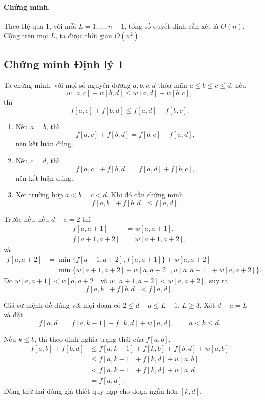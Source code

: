 \documentclass[11pt]{article}
\begin{document}
\paragraph{Chứng minh.}
Theo Hệ quả 1, với mỗi $L=1,\ldots,n-1$, tổng số quyết định cần xét là
$O(n)$. Cộng trên mọi $L$, ta được thời gian $O(n^2)$.

\subsection*{Chứng minh Định lý 1}

Ta chứng minh: với mọi số nguyên dương $a,b,c,d$ thỏa mãn
$a\le b\le c\le d$, nếu
\[
  w[a,c]+w[b,d]\le w[a,d]+w[b,c],
\]
thì
\[
  f[a,c]+f[b,d]\le f[a,d]+f[b,c].
\]

\begin{enumerate}
  \item Nếu $a=b$, thì
  \[
    f[a,c]+f[b,d]=f[b,c]+f[a,d],
  \]
  nên kết luận đúng.

  \item Nếu $c=d$, thì
  \[
    f[a,c]+f[b,d]=f[a,d]+f[b,c],
  \]
  nên kết luận đúng.

  \item Xét trường hợp $a<b=c<d$. Khi đó cần chứng minh
  \[
    f[a,b]+f[b,d]\le f[a,d].
  \]
\end{enumerate}

Trước hết, nếu $d-a=2$ thì
\[
\begin{aligned}
  f[a,a+1]&=w[a,a+1],\\
  f[a+1,a+2]&=w[a+1,a+2],
\end{aligned}
\]
và
\[
\begin{aligned}
  f[a,a+2]
  &=\min\{f[a+1,a+2],f[a,a+1]\}+w[a,a+2]\\
  &=\min\{w[a+1,a+2]+w[a,a+2],
          w[a,a+1]+w[a,a+2]\}.
\end{aligned}
\]
Do $w[a,a+1]<w[a,a+2]$ và $w[a+1,a+2]<w[a,a+2]$, suy ra
\[
  f[a,b]+f[b,d]<f[a,d].
\]

Giả sử mệnh đề đúng với mọi đoạn có $2\le d-a\le L-1$, $L\ge3$. Xét
$d-a=L$ và đặt
\[
  f[a,d]=f[a,k-1]+f[k,d]+w[a,d],
  \qquad a<k\le d.
\]

Nếu $k\le b$, thì theo định nghĩa trạng thái của $f[a,b]$,
\[
\begin{aligned}
  f[a,b]+f[b,d]
  &\le f[a,k-1]+f[k,b]+f[b,d]+w[a,b]\\
  &\le f[a,k-1]+f[k,d]+w[a,b]\\
  &< f[a,k-1]+f[k,d]+w[a,d]\\
  &=f[a,d].
\end{aligned}
\]
Dòng thứ hai dùng giả thiết quy nạp cho đoạn ngắn hơn $[k,d]$.
\end{document}
